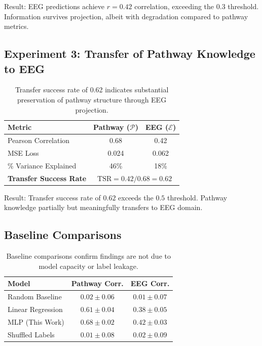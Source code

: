 Result: EEG predictions achieve $r = 0.42$ correlation, exceeding the $0.3$ threshold. Information survives projection, albeit with degradation compared to pathway metrics.

\subsection{Experiment 3: Transfer of Pathway Knowledge to EEG}

\begin{table}[H]
\centering
\begin{tabular}{lcc}
\toprule
\textbf{Metric} & \textbf{Pathway ($\mathcal{P}$)} & \textbf{EEG ($\mathcal{E}$)} \\
\midrule
Pearson Correlation & 0.68 & 0.42 \\
MSE Loss & 0.024 & 0.062 \\
\% Variance Explained & 46\% & 18\% \\
\midrule
\textbf{Transfer Success Rate} & \multicolumn{2}{c}{$\text{TSR} = 0.42 / 0.68 = \mathbf{0.62}$} \\
\bottomrule
\end{tabular}
\caption{Transfer success rate of 0.62 indicates substantial preservation of pathway structure through EEG projection.}
\label{tab:exp3_results}
\end{table}

Result: Transfer success rate of $0.62$ exceeds the $0.5$ threshold. Pathway knowledge partially but meaningfully transfers to EEG domain.

\subsection{Baseline Comparisons}

\begin{table}[H]
\centering
\begin{tabular}{lcc}
\toprule
\textbf{Model} & \textbf{Pathway Corr.} & \textbf{EEG Corr.} \\
\midrule
Random Baseline & $0.02 \pm 0.06$ & $0.01 \pm 0.07$ \\
Linear Regression & $0.61 \pm 0.04$ & $0.38 \pm 0.05$ \\
MLP (This Work) & $0.68 \pm 0.02$ & $0.42 \pm 0.03$ \\
Shuffled Labels & $0.01 \pm 0.08$ & $0.02 \pm 0.09$ \\
\bottomrule
\end{tabular}
\caption{Baseline comparisons confirm findings are not due to model capacity or label leakage.}
\label{tab:baselines}
\end{table}


